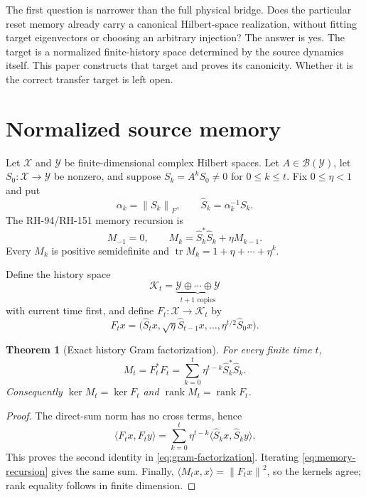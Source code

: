 \documentclass[12pt]{article}
\newtheorem{theorem}{Theorem}[section]
\theoremstyle{definition}
\theoremstyle{remark}
\newcommand{\cX}{\mathcal X}
\newcommand{\cY}{\mathcal Y}
\newcommand{\cK}{\mathcal K}
\newcommand{\rank}{\operatorname{rank}}
\newcommand{\norm}[1]{\left\lVert#1\right\rVert}
\begin{document}
The first question is narrower than the full physical bridge.  Does the
particular reset memory already carry a canonical Hilbert-space realization,
without fitting target eigenvectors or choosing an arbitrary injection?  The
answer is yes.  The target is a normalized finite-history space determined by
the source dynamics itself.  This paper constructs that target and proves its
canonicity.  Whether it is the correct transfer target is left open.

\section{Normalized source memory}

Let $\cX$ and $\cY$ be finite-dimensional complex Hilbert spaces.  Let
$A\in\mathcal B(\cY)$, let $S_0:\cX\to\cY$ be nonzero, and suppose
$S_k=A^kS_0\ne0$ for $0\le k\le t$.  Fix $0\le\eta<1$ and put
\[
 \alpha_k=\norm{S_k}_F,
 \qquad \widehat S_k=\alpha_k^{-1}S_k.
\]
The RH-94/RH-151 memory recursion is
\begin{equation}\label{eq:memory-recursion}
 M_{-1}=0,
 \qquad
 M_k=\widehat S_k^*\widehat S_k+\eta M_{k-1}.
\end{equation}
Every $M_k$ is positive semidefinite and
$\operatorname{tr}M_k=1+\eta+\cdots+\eta^k$.

Define the history space
\[
 \cK_t=\underbrace{\cY\oplus\cdots\oplus\cY}_{t+1\text{ copies}}
\]
with current time first, and define $F_t:\cX\to\cK_t$ by
\begin{equation}\label{eq:history-factor}
 F_tx=
 \bigl(\widehat S_tx,\sqrt\eta\widehat S_{t-1}x,
 \ldots,\eta^{t/2}\widehat S_0x\bigr).
\end{equation}

\begin{theorem}[Exact history Gram factorization]\label{thm:gram}
For every finite time $t$,
\begin{equation}\label{eq:gram-factorization}
 M_t=F_t^*F_t
 =\sum_{k=0}^t\eta^{t-k}\widehat S_k^*\widehat S_k.
\end{equation}
Consequently $\ker M_t=\ker F_t$ and
$\rank M_t=\rank F_t$.
\end{theorem}

\begin{proof}
The direct-sum norm has no cross terms, hence
\[
 \langle F_tx,F_ty\rangle
 =\sum_{k=0}^t\eta^{t-k}
 \langle\widehat S_kx,\widehat S_ky\rangle.
\]
This proves the second identity in \eqref{eq:gram-factorization}.  Iterating
\eqref{eq:memory-recursion} gives the same sum.  Finally,
$\langle M_tx,x\rangle=\norm{F_tx}^2$, so the kernels agree; rank equality
follows in finite dimension.
\end{proof}
\end{document}
